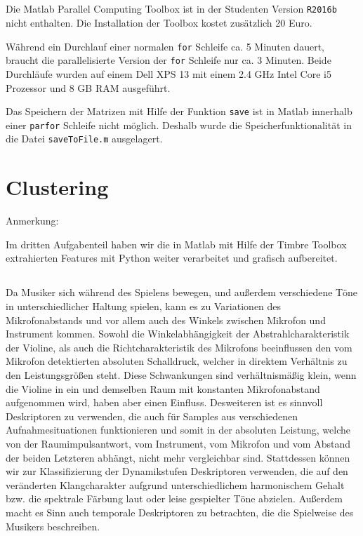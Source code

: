 \subsection{}
Die Matlab Parallel Computing Toolbox ist in der Studenten Version \texttt{R2016b} nicht enthalten.
Die Installation der Toolbox kostet zusätzlich 20 Euro.

Während ein Durchlauf einer normalen \texttt{for} Schleife ca. 5 Minuten dauert, braucht die parallelisierte Version der \texttt{for} Schleife nur ca. 3 Minuten.
Beide Durchläufe wurden auf einem Dell XPS 13 mit einem 2.4 GHz Intel Core i5 Prozessor und 8 GB RAM ausgeführt.

Das Speichern der Matrizen mit Hilfe der Funktion \texttt{save} ist in Matlab innerhalb einer \texttt{parfor} Schleife nicht möglich.
Deshalb wurde die Speicherfunktionalität in die Datei \texttt{saveToFile.m} ausgelagert.

\newpage

\section{Clustering}
\label{sec:cluster}

Anmerkung:

Im dritten Aufgabenteil haben wir die in Matlab mit Hilfe der Timbre Toolbox extrahierten Features mit Python weiter verarbeitet und grafisch aufbereitet.

\subsection{}

Da Musiker sich während des Spielens bewegen, und außerdem verschiedene Töne in unterschiedlicher Haltung spielen, kann es zu Variationen des Mikrofonabstands und vor allem auch des Winkels zwischen Mikrofon und Instrument kommen. 
Sowohl die Winkelabhängigkeit der Abstrahlcharakteristik der Violine, als auch die Richtcharakteristik des Mikrofons beeinflussen den vom Mikrofon detektierten absoluten Schalldruck, welcher in direktem Verhältnis zu den Leistungsgrößen steht. 
Diese Schwankungen sind verhältnismäßig klein, wenn die Violine in ein und demselben Raum mit konstanten Mikrofonabstand aufgenommen wird, haben aber einen Einfluss.
Desweiteren ist es sinnvoll Deskriptoren zu verwenden, die auch für Samples aus verschiedenen Aufnahmesituationen funktionieren und somit in der absoluten Leistung, welche von der Raumimpulsantwort, vom Instrument, vom Mikrofon und vom Abstand der beiden Letzteren abhängt, nicht mehr vergleichbar sind.
Stattdessen können wir zur Klassifizierung der Dynamikstufen Deskriptoren verwenden, die auf den veränderten Klangcharakter aufgrund unterschiedlichem harmonischem Gehalt bzw. die spektrale Färbung laut oder leise gespielter Töne abzielen.
Außerdem macht es Sinn auch temporale Deskriptoren zu betrachten, die die Spielweise des Musikers beschreiben.
